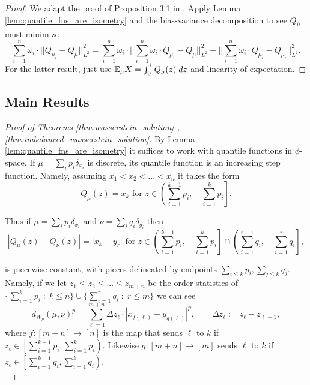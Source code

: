 \begin{subappendices}
\begin{lemma}
\end{lemma}

\begin{proof}
    We adapt the proof of Proposition 3.1 in \cite{raban2024_aggregate_ratings_wasserstein_barycenters}. Apply Lemma \ref{lem:quantile_fns_are_isometry} and the bias-variance decomposition to see $Q_{\overline{\mu}}$ must minimize
    \[ \sum_{i=1}^n \omega_i \cdot ||Q_{\mu_i} - Q_{\overline{\mu}}||^2_{L^2} =  \sum_{i=1}^n \omega_i \cdot \bigg|\bigg|  \sum_{i=1}^n \omega_i \cdot Q_{\mu_i} - Q_{\overline{\mu}}\bigg |\bigg|^2_{L^2} +  \bigg|\bigg|  \sum_{i=1}^n \omega_i \cdot Q_{\mu_i} - Q_{\mu_i}\bigg |\bigg|^2_{L^2}.\]
    \noindent For the latter result, just use $\mathbb{E}_\mu X = \int_0^1 Q_\mu(z) \; dz$ and linearity of expectation.
\end{proof}

\subsection{Main Results}

\begin{proof}[Proof of Theorems \ref{thm:wasserstein_solution} ,\ref{thm:imbalanced_wasserstein_solution}]
    \label{proof:imbalanced_wasserstein_solution}
    By Lemma \ref{lem:quantile_fns_are_isometry} it suffices to work with quantile functions in $\phi$-space. If $\mu = \sum_i p_i \delta_{x_i}$ is discrete, its quantile function is an increasing step function. Namely, assuming $x_1 < x_2 < ... < x_n$ it takes the form
%
\[Q_\mu(z) = x_k \text{  for  } z\in \left(\sum_{i=1}^{k-1} p_i, \quad \sum_{i=1}^k p_i \right]. \]
%

\noindent Thus if $\mu = \sum_i p_i \delta_{x_i}$ and $\nu = \sum_i q_i \delta_{y_i}$ then
%
\[|Q_\mu(z) - Q_\nu(z)| = |x_k - y_r| \text{ for } z \in \left(\sum_{i=1}^{k-1} p_i, \quad \sum_{i=1}^k p_i \right] \cap \left(\sum_{i=1}^{r-1} q_i, \quad \sum_{i=1}^r q_i \right],\]

\noindent is piecewise constant, with pieces delineated by endpoints $\sum_{i \leq k} p_i, \sum_{j \leq k} q_j$. Namely, if we let $z_1 \leq z_2 \leq ... \leq z_{m+n}$ be the order statistics of $\{\sum_{i=1}^{k} p_i \; : \; k \leq n\} \cup \{\sum_{i=1}^{r} q_i \; : \; r \leq m\}$ we can see
%
\[d_{W_p}(\mu, \nu)^p = \sum_{\ell = 1}^{m+n} \Delta z_\ell \cdot | x_{f(\ell)} - y_{g(\ell)}|^p, \qquad \Delta z_\ell := z_\ell - z_{\ell - 1},\]
%
\noindent where $f:[m+n] \to [n]$ is the map that sends $\ell$ to $k$ if $z_\ell \in \left[\sum_{i=1}^{k-1} p_i,  \sum_{i=1}^k p_i \right)$. Likewise $g : [m+n] \to [m]$ sends $\ell$ to $k$ if $z_\ell \in \left[\sum_{i=1}^{k-1} q_i,  \sum_{i=1}^k q_i \right)$.\\



\end{proof}
\end{subappendices}
